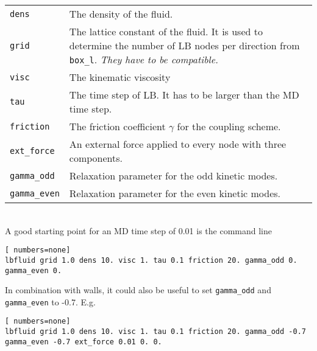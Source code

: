 \begin{tabular}{p{}p{}}
\lstinline|dens| & The density of the fluid.\\
\lstinline|grid| & The lattice constant of the fluid. It is used to determine the number of LB nodes 
per direction from \lstinline|box_l|. {\em They have to be compatible.} \\
\lstinline|visc| & The kinematic viscosity \\
\lstinline|tau| & The time step of LB. It has to be larger than the MD time step. \\
\lstinline|friction| & The friction coefficient $\gamma$ for the coupling scheme. \\
\lstinline|ext_force| & An external force applied to every node with three components. \\
\lstinline|gamma_odd| & Relaxation parameter for the odd kinetic modes. \\
\lstinline|gamma_even| & Relaxation parameter for the even kinetic modes.
\end{tabular} \\

A good starting point for an MD time step of 0.01 is the command line
\vspace{0,2cm}
\begin{lstlisting}[ numbers=none]
lbfluid grid 1.0 dens 10. visc 1. tau 0.1 friction 20. gamma_odd 0. gamma_even 0.
\end{lstlisting}
\vspace{0,2cm}

In combination with walls, it could also be useful to set \lstinline|gamma_odd| and
\lstinline|gamma_even| to -0.7. E.g. 
\vspace{0,2cm}
\begin{lstlisting}[ numbers=none]
lbfluid grid 1.0 dens 10. visc 1. tau 0.1 friction 20. gamma_odd -0.7 gamma_even -0.7 ext_force 0.01 0. 0.
\end{lstlisting}
\vspace{0,2cm}


